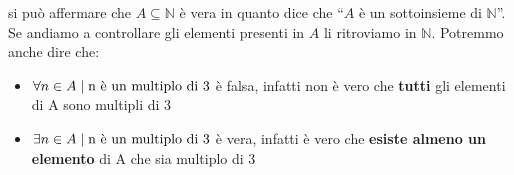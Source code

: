 \documentclass[12pt,a4paper]{article}
\newcommand{\Setsuchthat}{\;\ifnum\currentgrouptype=16 \middle\fi|\;} %
\begin{document}
  si può affermare che $ A \subseteq \mathbb{N} $ è vera in quanto dice che ``$A$ è un sottoinsieme
  di $\mathbb{N}$''. Se andiamo a controllare gli elementi presenti in $A$ li ritroviamo
  in $\mathbb{N}$. Potremmo anche dire che:

  \begin{itemize}
    \item $ \forall n \in A \Setsuchthat \text{n è un multiplo di 3} $ è falsa, infatti non è vero che \textbf{tutti} gli elementi di A sono multipli di 3

    \item $ \exists n \in A \Setsuchthat \text{n è un multiplo di 3} $ è vera, infatti è vero che \textbf{esiste almeno un elemento} di A che sia multiplo di 3
  \end{itemize}
\end{document}
